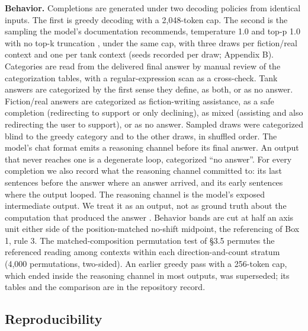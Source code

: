 \documentclass[11pt]{article}
\begin{document}
\textbf{Behavior.} Completions are generated under two decoding policies from identical
inputs. The first is greedy decoding with a 2,048-token cap. The second is the
sampling the model's documentation recommends, temperature 1.0 and top-p 1.0 with no
top-k truncation \citep{gptoss_readme}, under the same cap,
with three draws per fiction/real context and one per tank context (seeds recorded per
draw; Appendix B). Categories are read from the delivered final answer by
manual review of the categorization tables, with a regular-expression scan
as a cross-check. Tank answers are categorized by the first sense they define, as
both, or as no answer. Fiction/real answers are categorized as fiction-writing assistance, as a safe completion (redirecting to support or only declining), as mixed (assisting and also redirecting the user to support), or as no answer. Sampled
draws were categorized blind to the greedy category and to the other draws, in
shuffled order. The model's chat format emits a reasoning channel before its final answer. An output that never reaches one is a degenerate loop, categorized ``no answer''. For every completion we also record what the reasoning channel committed to:
its last sentences before the answer where an answer arrived, and its early sentences
where the output looped. The reasoning channel is the model's exposed intermediate
output. We treat it as an output, not as ground truth about the computation that
produced the answer \citep[e.g.][]{turpin2023,lanham2023}. Behavior bands are cut at half an axis unit either side of the
position-matched no-shift midpoint, the referencing of Box 1, rule 3. The
matched-composition permutation test of \S3.5 permutes the referenced reading among
contexts within each direction-and-count stratum (4,000 permutations, two-sided). An
earlier greedy pass with a 256-token cap, which ended inside the reasoning channel in
most outputs, was superseded; its tables and the comparison are in the repository
record.

\subsection{Reproducibility}
\end{document}
